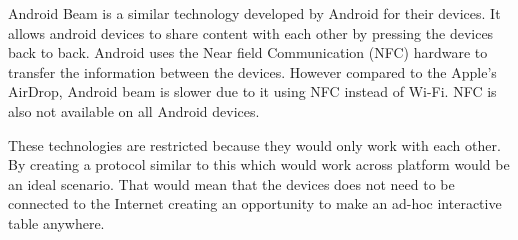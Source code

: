 Android Beam\cite{android-beam} is a similar technology developed
by Android for their devices. It allows android devices to share content
with each other by pressing the devices back to back. Android uses
the Near field Communication (NFC) hardware to transfer the information
between the devices. However compared to the Apple's AirDrop, Android
beam is slower due to it using NFC instead of Wi-Fi. NFC is also not
available on all Android devices.

These technologies are restricted because they would only work with
each other. By creating a protocol similar to this which would work
across platform would be an ideal scenario. That would mean that the
devices does not need to be connected to the Internet creating an
opportunity to make an ad-hoc interactive table anywhere.

